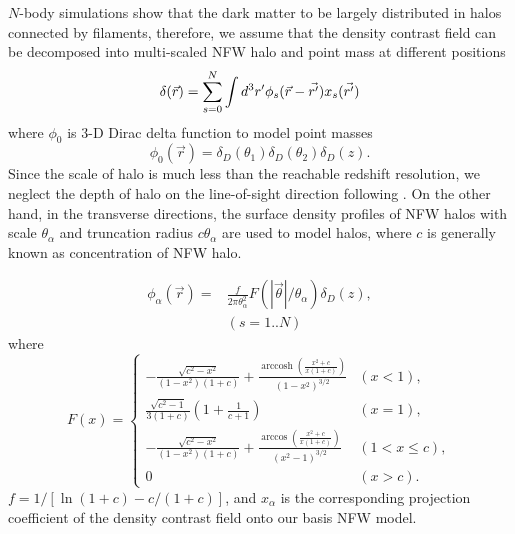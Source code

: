 \documentclass[twocolumn]{aastex62}
\DeclareMathOperator{\arccosh}{arccosh}
\begin{document}
$N$-body simulations show that the dark matter to be largely distributed in halos connected by filaments, therefore,
we assume that the density contrast field can be decomposed into multi-scaled NFW halo \citep{halo-NFW1997ApJ} and
point mass at different positions
\begin{equation}
\delta(\vec{r}) = \sum_{s=0}^{N} \int d^3 r' \phi_s(\vec{r}-\vec{r'}) x_s(\vec{r'})\\
\end{equation}
where $\phi_0$ is $3$-D Dirac delta function to model point masses
\begin{equation}
\phi_0(\vec{r})= \delta_D(\theta_1) \delta_D(\theta_2) \delta_D(z).
\end{equation}
Since the scale of halo is much less than the reachable redshift resolution, we neglect the depth of halo on the 
line-of-sight direction following \citep{LSS-massMap-Glimpse3D-Leonard2014}. On the other hand, in the transverse directions, 
the surface density profiles of NFW halos with scale $\theta_\alpha$ and truncation radius $c \theta_\alpha$ 
\citep{haloModel-TJ2003-3pt} are used to model halos, where $c$ is generally known as concentration of NFW halo.  

\begin{equation}
\begin{split}
\phi_\alpha(\vec{r}) =&\frac{f }{2 \pi \theta_\alpha^2 } F(|\vec{\theta}|/\theta_\alpha) \delta_D(z),\\
&  (s=1..N)
\end{split}
\end{equation}
where
\begin{equation}
F(x)=
\begin{cases}
-\frac{\sqrt{c^2-x^2}}{(1-x^2)(1+c)} + \frac{\arccosh \left(\frac{x^2+c}{x(1+c)}\right)}{(1-x^2)^{3/2}}  & (x<1),\\
\frac{\sqrt{c^2-1}}{3(1+c)} (1+\frac{1}{c+1}) & (x=1),\\
-\frac{\sqrt{c^2-x^2}}{(1-x^2)(1+c)} + \frac{\arccos\left(\frac{x^2+c}{x(1+c)}\right)}{(x^2-1)^{3/2}} & (1<x\leq c),\\
0& (x>c).
\end{cases}
\end{equation}
$f=1/[\ln (1+c)-c/(1+c)]$, and $x_\alpha$ is the corresponding projection coefficient of the density contrast
field onto our basis NFW model.
\end{document}

